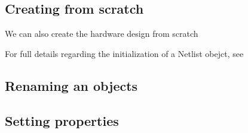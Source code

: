 \documentclass[letterpaper,10pt,english,openany,oneside]{sphinxmanual}
\begin{document}
\subsection{Creating from scratch}
\label{\detokenize{tutorial:creating-from-scratch}}\begin{description}
\item[{We can also create the hardware design from scratch}] \leavevmode
\begin{sphinxVerbatim}[commandchars=\\\{\}]
   
  
  
\end{sphinxVerbatim}

\end{description}

For full details regarding the initialization of a Netlist obejct, see {\hyperref[\detokenize{reference/classes/netlist:netlist}]{}}


\subsection{Renaming an objects}
\label{\detokenize{tutorial:renaming-an-objects}}
\begin{sphinxVerbatim}[commandchars=\\\{\}]
  
\end{sphinxVerbatim}


\subsection{Setting properties}
\label{\detokenize{tutorial:setting-properties}}
\begin{sphinxVerbatim}[commandchars=\\\{\}]
\PYG{p}{[}\PYG{p}{]}  
\end{sphinxVerbatim}
\end{document}
